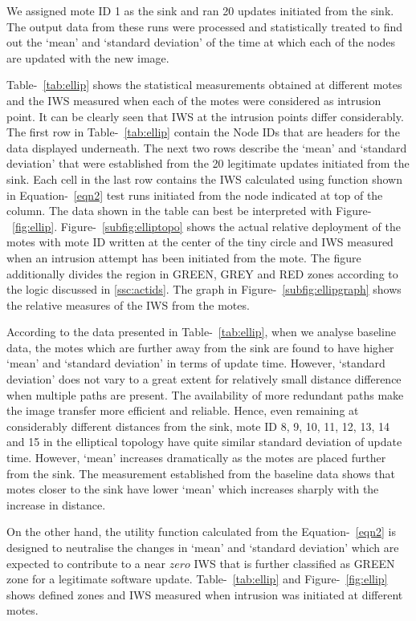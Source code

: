\documentclass[conference,final]{IEEEtran}
\begin{document}
We assigned mote ID 1 as the sink and ran 20 updates initiated from the sink.
The output data from these runs were processed and statistically treated to find out the `mean' and `standard deviation' of the  time at which each of the nodes are updated with the new image.


Table-~\ref{tab:ellip} shows the statistical measurements obtained at different motes and the IWS measured when each of the motes were considered as intrusion point.
It can be clearly seen that IWS at the intrusion points differ considerably.
The first row in Table-~\ref{tab:ellip} contain the Node IDs that are headers for the data displayed underneath.
The next two rows describe the `mean' and `standard deviation' that were established from the 20 legitimate updates initiated from the sink.
Each cell in the last row contains the IWS calculated using function shown in Equation-~\ref{eqn2} test runs initiated from the node indicated at top of the column.
The data shown in the table can best be interpreted with Figure-~\ref{fig:ellip}. 
Figure-~\ref{subfig:elliptopo} shows the actual relative deployment of the motes with mote ID written at the center of the tiny circle and IWS measured when an intrusion attempt has been initiated from the mote. 
The figure additionally divides the region in GREEN, GREY and RED zones according to the logic discussed in \ref{ssc:actids}.
The graph in  Figure-~\ref{subfig:ellipgraph} shows the relative measures of the IWS from the motes.

According to the data presented in Table-~\ref{tab:ellip}, when we analyse baseline data, the motes which are further away from the sink are found to have higher `mean' and `standard deviation' in terms of update time.  
However, `standard deviation' does not vary to a great extent for relatively small distance difference when multiple paths are present.
The availability of more redundant paths make the image transfer more efficient and reliable.
Hence, even remaining at considerably different distances from the sink, mote ID 8, 9, 10, 11, 12, 13, 14 and 15 in the elliptical topology have quite similar standard deviation of update time.
However, `mean' increases dramatically as the motes are placed further from the sink.
The measurement established from the baseline data shows that motes closer to the sink have lower `mean' which increases sharply with the increase in distance.

On the other hand, the utility function calculated from the Equation-~\ref{eqn2} is designed to neutralise the changes in `mean' and `standard deviation' which are expected to contribute to a near $zero$ IWS that is further classified as GREEN zone for a legitimate software update. Table-~\ref{tab:ellip} and Figure-~\ref{fig:ellip} shows defined zones and IWS measured when intrusion was initiated at different motes.
\end{document}
